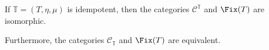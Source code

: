 If $\mathbb{T} = (T, \eta, \mu)$ is idempotent, then the categories
$\mathcal{C}^{\mathbb{T}}$ and $\Fix(T)$ are isomorphic.

Furthermore, the categories $\mathcal{C}_{\mathbb{T}}$ and $\Fix(T)$ are equivalent.
